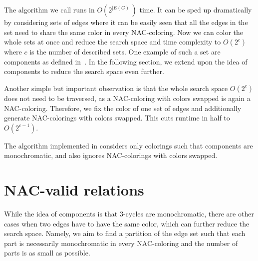 The algorithm we call \Naive{} runs in \( O(2^{|E(G)|}) \) time.
It can be sped up dramatically by considering sets of edges
where it can be easily seen that all the edges in the set need to share
the same color in every NAC-coloring.
%
Now we can color the whole sets at once
and reduce the search space and time complexity to \( O(2^{c}) \)
where \( c \) is the number of described sets.
One example of such a set are \trcon{} components
as defined in~.
In the following section, we extend upon the idea of \trcon{} components
to reduce the search space even further.

Another simple but important observation is that the whole search space \( O(2^{c}) \)
does not need to be traversed, as a NAC-coloring with colors swapped is again a NAC-coloring.
Therefore, we fix the color of one set of edges and additionally generate NAC-colorings with colors swapped.
This cuts runtime in half%
to \( O(2^{c-1}) \).


The algorithm implemented in \flexrilog{}
considers only colorings such that \trcon{} components are monochromatic,
and also ignores NAC-colorings with colors swapped.

\section{NAC-valid relations}%
\label{sec:NACvalid}

While the idea of \trcon{} components is that 3-cycles are monochromatic,
there are other cases when two edges have to have the same color,
which can further reduce the search space.
Namely, we aim to find a partition of the edge set such that each part is necessarily monochromatic
in every NAC-coloring and the number of parts is as small as possible.

